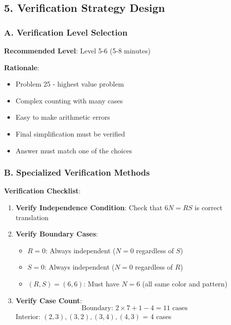 \documentclass[12pt]{article}
\begin{document}
\begin{verificationbox}
\subsection*{5. Verification Strategy Design}

\subsubsection*{A. Verification Level Selection}

\textbf{Recommended Level}: Level 5-6 (5-8 minutes)

\textbf{Rationale}:
\begin{itemize}
    \item Problem 25 - highest value problem
    \item Complex counting with many cases
    \item Easy to make arithmetic errors
    \item Final simplification must be verified
    \item Answer must match one of the choices
\end{itemize}

\subsubsection*{B. Specialized Verification Methods}

\textbf{Verification Checklist}:

\begin{enumerate}
    \item \textbf{Verify Independence Condition}:
    Check that $6N = RS$ is correct translation
    
    \item \textbf{Verify Boundary Cases}:
    \begin{itemize}
        \item $R = 0$: Always independent ($N = 0$ regardless of $S$)
        \item $S = 0$: Always independent ($N = 0$ regardless of $R$)
        \item $(R, S) = (6, 6)$: Must have $N = 6$ (all same color and pattern)
    \end{itemize}
    
    \item \textbf{Verify Case Count}:
    $$\text{Boundary: } 2 \times 7 + 1 - 4 = 11 \text{ cases}$$
    Interior: $(2,3), (3,2), (3,4), (4,3)$ = 4 cases
    

\end{enumerate}
\end{verificationbox}
\end{document}
